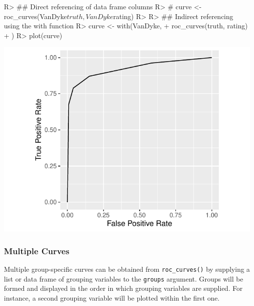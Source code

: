 \documentclass[
]{jss}
\begin{document}
\begin{CodeChunk}
\begin{CodeInput}
R> ## Direct referencing of data frame columns
R> # curve <- roc_curves(VanDyke$truth, VanDyke$rating)
R> 
R> ## Indirect referencing using the with function
R> curve <- with(VanDyke, {
+   roc_curves(truth, rating)
+ })
R> plot(curve)
\end{CodeInput}


\begin{center}\includegraphics{MRMCaov_files/figure-latex/using_curves_one-1} \end{center}

\end{CodeChunk}

\hypertarget{multiple-curves}{%
\subsubsection{Multiple Curves}\label{multiple-curves}}

Multiple group-specific curves can be obtained from
\texttt{roc\_curves()} by supplying a list or data frame of grouping
variables to the \texttt{groups} argument. Groups will be formed and
displayed in the order in which grouping variables are supplied. For
instance, a second grouping variable will be plotted within the first
one.
\end{document}
